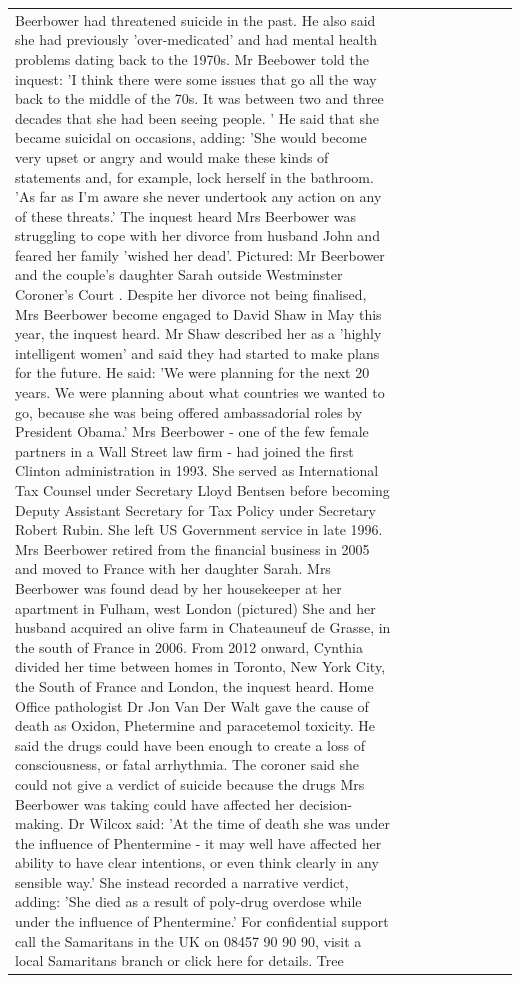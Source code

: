 \begin{table}[H]
\begin{tabular}{lllrlllll}
Beerbower had threatened suicide in the past. He also said she had previously 'over-medicated' and had mental health problems dating back to the 1970s. Mr Beebower told the inquest: 'I think there were some issues that go all the way back to the middle of the 70s. It was between two and three decades that she had been seeing people. ' He said that she became suicidal on occasions, adding: 'She would become very upset or angry and would make these kinds of statements and, for example, lock herself in the bathroom. 'As far as I'm aware she never undertook any action on any of these threats.' The inquest heard Mrs Beerbower was struggling to cope with her divorce from husband John and feared her family 'wished her dead'. Pictured: Mr Beerbower and the couple's daughter Sarah outside Westminster Coroner's Court . Despite her divorce not being finalised, Mrs Beerbower become engaged to David Shaw in May this year, the inquest heard. Mr Shaw described her as a 'highly intelligent women' and said they had started to make plans for the future. He said: 'We were planning for the next 20 years. We were planning about what countries we wanted to go, because she was being offered ambassadorial roles by President Obama.' Mrs Beerbower - one of the few female partners in a Wall Street law firm - had joined the first Clinton administration in 1993. She served as International Tax Counsel under Secretary Lloyd Bentsen before becoming Deputy Assistant Secretary for Tax Policy under Secretary Robert Rubin. She left US Government service in late 1996. Mrs Beerbower retired from the financial business in 2005 and moved to France with her daughter Sarah. Mrs Beerbower was found dead by her housekeeper at her apartment in Fulham, west London (pictured) She and her husband acquired an olive farm in Chateauneuf de Grasse, in the south of France in 2006. From 2012 onward, Cynthia divided her time between homes in Toronto, New York City, the South of France and London, the inquest heard. Home Office pathologist Dr Jon Van Der Walt gave the cause of death as Oxidon, Phetermine and paracetemol toxicity. He said the drugs could have been enough to create a loss of consciousness, or fatal arrhythmia. The coroner said she could not give a verdict of suicide because the drugs Mrs Beerbower was taking could have affected her decision-making. Dr Wilcox said: 'At the time of death she was under the influence of Phentermine - it may well have affected her ability to have clear intentions, or even think clearly in any sensible way.' She instead recorded a narrative verdict, adding: 'She died as a result of poly-drug overdose while under the influence of Phentermine.' For confidential support call the Samaritans in the UK on 08457 90 90 90, visit a local Samaritans branch or click here for details. Tree \\

\end{tabular}
\end{table}
